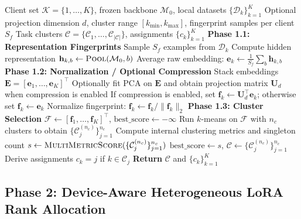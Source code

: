 \documentclass[conference]{IEEEtran}
\begin{document}
\begin{algorithm}[t]
\caption{Representation-Based Task Clustering in ATLAS}
\label{alg:task_clustering}
\begin{algorithmic}[1]
\Require Client set $\mathcal{K} = \{1, \ldots, K\}$, frozen backbone $\mathcal{M}_0$, local datasets $\{\mathcal{D}_k\}_{k=1}^K$
\Require Optional projection dimension $d$, cluster range $[k_{\min}, k_{\max}]$, fingerprint samples per client $S_f$
\Ensure Task clusters $\mathcal{C} = \{\mathcal{C}_1, \ldots, \mathcal{C}_{|\mathcal{C}|}\}$, assignments $\{c_k\}_{k=1}^K$
\State \textbf{Phase 1.1: Representation Fingerprints}
  \State Sample $S_f$ examples from $\mathcal{D}_k$
    \State Compute hidden representation $\mathbf{h}_{k,b} \leftarrow \textsc{Pool}(\mathcal{M}_0, b)$
  \EndFor
  \State Average raw embedding: $\mathbf{e}_k \leftarrow \frac{1}{S_f}\sum_b \mathbf{h}_{k,b}$
\EndFor
\State \textbf{Phase 1.2: Normalization / Optional Compression}
\State Stack embeddings $\mathbf{E} = [\mathbf{e}_1, \ldots, \mathbf{e}_K]^\top$
\State Optionally fit PCA on $\mathbf{E}$ and obtain projection matrix $\mathbf{U}_d$ when compression is enabled
  \State If compression is enabled, set $\mathbf{f}_k \leftarrow \mathbf{U}_d^\top \mathbf{e}_k$; otherwise set $\mathbf{f}_k \leftarrow \mathbf{e}_k$
  \State Normalize fingerprint: $\mathbf{f}_k \leftarrow \mathbf{f}_k / \|\mathbf{f}_k\|_2$
\EndFor
\State \textbf{Phase 1.3: Cluster Selection}
\State $\mathcal{F} \leftarrow [\mathbf{f}_1, \ldots, \mathbf{f}_K]^\top$, $\text{best\_score} \leftarrow -\infty$
  \State Run $k$-means on $\mathcal{F}$ with $n_c$ clusters to obtain $\{\mathcal{C}_j^{(n_c)}\}_{j=1}^{n_c}$
  \State Compute internal clustering metrics and singleton count
  \State $s \leftarrow \textsc{MultiMetricScore}(\{\mathcal{C}_j^{(n_c)}\}_{j=1}^{n_c})$
    \State $\text{best\_score} \leftarrow s$, $\mathcal{C} \leftarrow \{\mathcal{C}_j^{(n_c)}\}_{j=1}^{n_c}$
  \EndIf
\EndFor
\State Derive assignments $c_k = j$ if $k \in \mathcal{C}_j$
\State \textbf{Return} $\mathcal{C}$ and $\{c_k\}_{k=1}^K$
\end{algorithmic}
\end{algorithm}


\subsection{Phase 2: Device-Aware Heterogeneous LoRA Rank Allocation}
\label{subsec:phase2}
\end{document}

